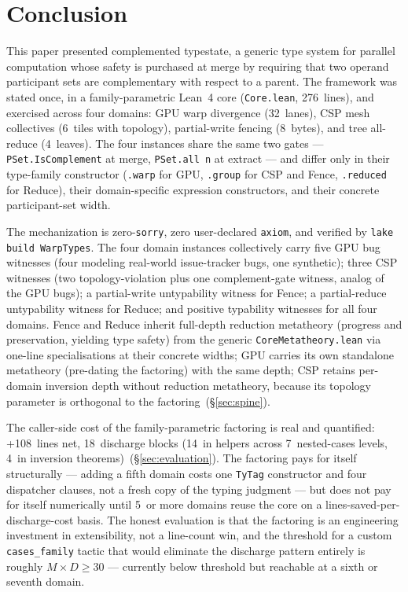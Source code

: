 \documentclass[acmsmall,screen,review,anonymous,nonacm]{acmart}
\newcommand{\TyTag}{\texttt{TyTag}}
\begin{document}

\section{Conclusion}\label{sec:conclusion}

This paper presented complemented typestate, a generic type system for parallel computation whose safety is purchased at merge by requiring that two operand participant sets are complementary with respect to a parent. The framework was stated once, in a family-parametric Lean~4 core (\texttt{Core.lean}, 276~lines), and exercised across four domains: GPU warp divergence (32~lanes), CSP mesh collectives (6~tiles with topology), partial-write fencing (8~bytes), and tree all-reduce (4~leaves). The four instances share the same two gates --- \texttt{PSet.IsComplement} at merge, \texttt{PSet.all n} at extract --- and differ only in their type-family constructor (\texttt{.warp} for GPU, \texttt{.group} for CSP and Fence, \texttt{.reduced} for Reduce), their domain-specific expression constructors, and their concrete participant-set width.

The mechanization is zero-\texttt{sorry}, zero user-declared \texttt{axiom}, and verified by \texttt{lake build WarpTypes}. The four domain instances collectively carry five GPU bug witnesses (four modeling real-world issue-tracker bugs, one synthetic); three CSP witnesses (two topology-violation plus one complement-gate witness, analog of the GPU bugs); a partial-write untypability witness for Fence; a partial-reduce untypability witness for Reduce; and positive typability witnesses for all four domains. Fence and Reduce inherit full-depth reduction metatheory (progress and preservation, yielding type safety) from the generic \texttt{CoreMetatheory.lean} via one-line specialisations at their concrete widths; GPU carries its own standalone metatheory (pre-dating the factoring) with the same depth; CSP retains per-domain inversion depth without reduction metatheory, because its topology parameter is orthogonal to the factoring~(\S\ref{sec:spine}).

The caller-side cost of the family-parametric factoring is real and quantified: +108~lines net, 18~discharge blocks (14~in helpers across 7~nested-cases levels, 4~in inversion theorems)~(\S\ref{sec:evaluation}). The factoring pays for itself structurally --- adding a fifth domain costs one \TyTag{} constructor and four dispatcher clauses, not a fresh copy of the typing judgment --- but does not pay for itself numerically until 5~or more domains reuse the core on a lines-saved-per-discharge-cost basis. The honest evaluation is that the factoring is an engineering investment in extensibility, not a line-count win, and the threshold for a custom \texttt{cases\_family} tactic that would eliminate the discharge pattern entirely is roughly $M \times D \geq 30$ --- currently below threshold but reachable at a sixth or seventh domain.
\end{document}
